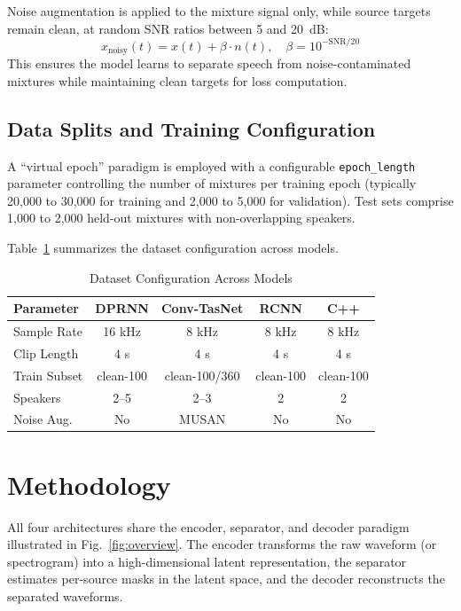 \documentclass[conference]{IEEEtran}
\begin{document}
Noise augmentation is applied to the mixture signal only, while source targets remain clean, at random SNR ratios between 5 and 20~dB:
\begin{equation}
x_{\text{noisy}}(t) = x(t) + \beta \cdot n(t), \quad \beta = 10^{-\text{SNR}/20}
\end{equation}
This ensures the model learns to separate speech from noise-contaminated mixtures while maintaining clean targets for loss computation.

\subsection{Data Splits and Training Configuration}

A ``virtual epoch'' paradigm is employed with a configurable \texttt{epoch\_length} parameter controlling the number of mixtures per training epoch (typically 20,000 to 30,000 for training and 2,000 to 5,000 for validation). Test sets comprise 1,000 to 2,000 held-out mixtures with non-overlapping speakers.

Table~\ref{tab:dataset_config} summarizes the dataset configuration across models.

\begin{table}[t]
\centering
\caption{Dataset Configuration Across Models}
\label{tab:dataset_config}
\begin{tabular}{@{}lcccc@{}}
\toprule
\textbf{Parameter} & \textbf{DPRNN} & \textbf{Conv-TasNet} & \textbf{RCNN} & \textbf{C++} \\
\midrule
Sample Rate & 16 kHz & 8 kHz & 8 kHz & 8 kHz \\
Clip Length & 4 s & 4 s & 4 s & 4 s \\
Train Subset & clean-100 & clean-100/360 & clean-100 & clean-100 \\
Speakers & 2--5 & 2--3 & 2 & 2 \\
Noise Aug. & No & MUSAN & No & No \\
\bottomrule
\end{tabular}
\end{table}

\section{Methodology}
\label{sec:methodology}

All four architectures share the encoder, separator, and decoder paradigm illustrated in Fig.~\ref{fig:overview}. The encoder transforms the raw waveform (or spectrogram) into a high-dimensional latent representation, the separator estimates per-source masks in the latent space, and the decoder reconstructs the separated waveforms.
\end{document}
